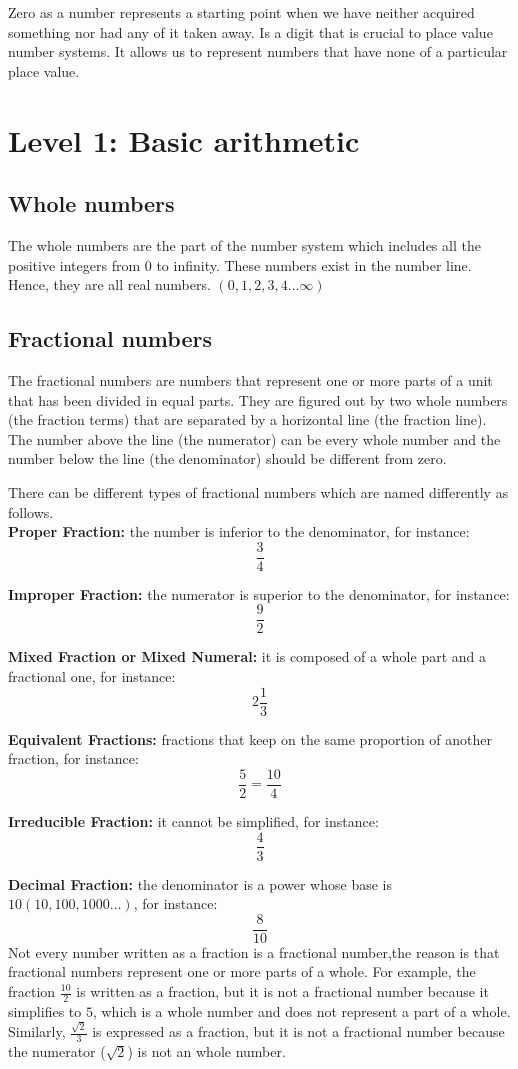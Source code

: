 \documentclass{article} %
\begin{document}
Zero as a number represents a starting point when we have neither acquired something nor had any of it taken away. Is a digit that is crucial to place value number systems. It allows us to represent numbers that have none of a particular place value.

\section{Level 1: Basic arithmetic}

\subsection{Whole numbers}
The whole numbers are the part of the number system which includes all the positive integers from 0 to infinity. These numbers exist in the number line. Hence, they are all real numbers. $(0, 1, 2, 3, 4 \dots \infty)$

\subsection{Fractional numbers}
The fractional numbers are numbers that represent one or more parts of a unit that has been divided in equal parts. They are figured out by two whole numbers (the fraction terms) that are separated by a horizontal line (the fraction line). The number above the line (the numerator) can be every whole number and the number below the line (the denominator) should be different from zero.

There can be different types of fractional numbers which are named differently as follows.\\

\textbf{Proper Fraction:} the number is inferior to the denominator, for instance:
\[
\frac{3}{4}
\]

\textbf{Improper Fraction:} the numerator is superior to the denominator, for instance:
\[
\frac{9}{2}
\]

\textbf{Mixed Fraction or Mixed Numeral:} it is composed of a whole part and a fractional one, for instance:
\[
2\frac{1}{3}
\]

\textbf{Equivalent Fractions:} fractions that keep on the same proportion of another fraction, for instance:
\[
\frac{5}{2} = \frac{10}{4}
\]

\textbf{Irreducible Fraction:} it cannot be simplified, for instance:
\[
\frac{4}{3}
\]

\textbf{Decimal Fraction:} the denominator is a power whose base is $10(10, 100, 1000 \dots)$, for instance:
\[
\frac{8}{10}
\]
Not every number written as a fraction is a fractional number,the reason is that fractional numbers represent one or more parts of a whole. For example, the fraction $\frac{10}{2}$ is written as a fraction, but it is not a fractional number because it simplifies to $5$, which is a whole number and does not represent a part of a whole. Similarly, $\frac{\sqrt{2}}{3}$ is expressed as a fraction, but it is not a fractional number because the numerator ($\sqrt{2}$) is not an whole number.
\end{document}
